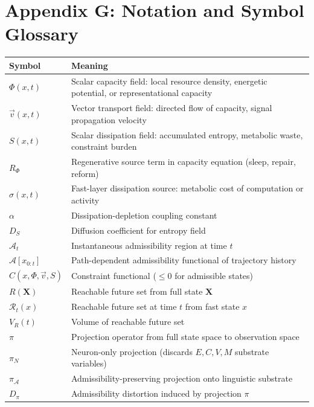 \documentclass[12pt,a4paper]{article}
\begin{document}
\section*{Appendix G: Notation and Symbol Glossary}
\label{app:glossary}

\begin{center}
\begin{tabular}{lp{9cm}}
\toprule
\textbf{Symbol} & \textbf{Meaning} \\
\midrule
$\Phi(x,t)$ & Scalar capacity field: local resource density, energetic potential, or representational capacity \\[4pt]
$\vec{v}(x,t)$ & Vector transport field: directed flow of capacity, signal propagation velocity \\[4pt]
$S(x,t)$ & Scalar dissipation field: accumulated entropy, metabolic waste, constraint burden \\[4pt]
$R_\Phi$ & Regenerative source term in capacity equation (sleep, repair, reform) \\[4pt]
$\sigma(x,t)$ & Fast-layer dissipation source: metabolic cost of computation or activity \\[4pt]
$\alpha$ & Dissipation-depletion coupling constant \\[4pt]
$D_S$ & Diffusion coefficient for entropy field \\[4pt]
$\mathcal{A}_t$ & Instantaneous admissibility region at time $t$ \\[4pt]
$\mathcal{A}[x_{0:t}]$ & Path-dependent admissibility functional of trajectory history \\[4pt]
$C(x, \Phi, \vec{v}, S)$ & Constraint functional ($\leq 0$ for admissible states) \\[4pt]
$R(\mathbf{X})$ & Reachable future set from full state $\mathbf{X}$ \\[4pt]
$\mathcal{R}_t(x)$ & Reachable future set at time $t$ from fast state $x$ \\[4pt]
$V_R(t)$ & Volume of reachable future set \\[4pt]
$\pi$ & Projection operator from full state space to observation space \\[4pt]
$\pi_N$ & Neuron-only projection (discards $E, C, V, M$ substrate variables) \\[4pt]
$\pi_\mathcal{A}$ & Admissibility-preserving projection onto linguistic substrate \\[4pt]
$D_\pi$ & Admissibility distortion induced by projection $\pi$ \\[4pt]

\end{tabular}
\end{center}
\end{document}
